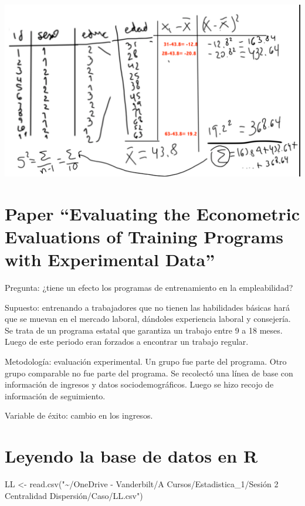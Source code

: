 \documentclass[
]{article}
\newenvironment{Shaded}{\begin{snugshade}}{\end{snugshade}}
\newcommand{\FunctionTok}[1]{\textcolor[rgb]{0.00,0.00,0.00}{#1}}
\newcommand{\NormalTok}[1]{#1}
\newcommand{\OtherTok}[1]{\textcolor[rgb]{0.56,0.35,0.01}{#1}}
\newcommand{\StringTok}[1]{\textcolor[rgb]{0.31,0.60,0.02}{#1}}
\begin{document}
\includegraphics[width=6.60417in,height=\textheight]{desviacion.png}

\hypertarget{paper-evaluating-the-econometric-evaluations-of-training-programs-with-experimental-data}{%
\section{Paper ``Evaluating the Econometric Evaluations of Training
Programs with Experimental
Data''}\label{paper-evaluating-the-econometric-evaluations-of-training-programs-with-experimental-data}}

Pregunta: ¿tiene un efecto los programas de entrenamiento en la
empleabilidad?

Supuesto: entrenando a trabajadores que no tienen las habilidades
básicas hará que se muevan en el mercado laboral, dándoles experiencia
laboral y consejería. Se trata de un programa estatal que garantiza un
trabajo entre 9 a 18 meses. Luego de este periodo eran forzados a
encontrar un trabajo regular.

Metodología: evaluación experimental. Un grupo fue parte del programa.
Otro grupo comparable no fue parte del programa. Se recolectó una línea
de base con información de ingresos y datos sociodemográficos. Luego se
hizo recojo de información de seguimiento.

Variable de éxito: cambio en los ingresos.

\hypertarget{leyendo-la-base-de-datos-en-r}{%
\section{Leyendo la base de datos en
R}\label{leyendo-la-base-de-datos-en-r}}

\begin{Shaded}
\begin{Highlighting}[]
\NormalTok{LL }\OtherTok{\textless{}{-}} \FunctionTok{read.csv}\NormalTok{(}\StringTok{"\textasciitilde{}/OneDrive {-} Vanderbilt/A Cursos/Estadistica\_1/Sesión 2 Centralidad Dispersión/Caso/LL.csv"}\NormalTok{)}
\end{Highlighting}
\end{Shaded}
\end{document}
